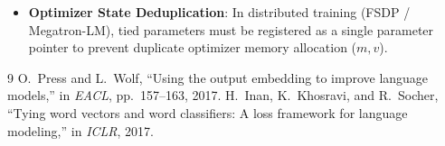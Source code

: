 \documentclass[11pt,a4paper]{article}
\theoremstyle{definition}
\begin{document}
\begin{itemize}
    \item \textbf{Optimizer State Deduplication}: In distributed training (FSDP / Megatron-LM), tied parameters must be registered as a single parameter pointer to prevent duplicate optimizer memory allocation ($m, v$).
\end{itemize}

\begin{thebibliography}{9}
 O.~Press and L.~Wolf, ``Using the output embedding to improve language models,'' in \emph{EACL}, pp.~157--163, 2017.
 H.~Inan, K.~Khosravi, and R.~Socher, ``Tying word vectors and word classifiers: A loss framework for language modeling,'' in \emph{ICLR}, 2017.
\end{thebibliography}
\end{document}

